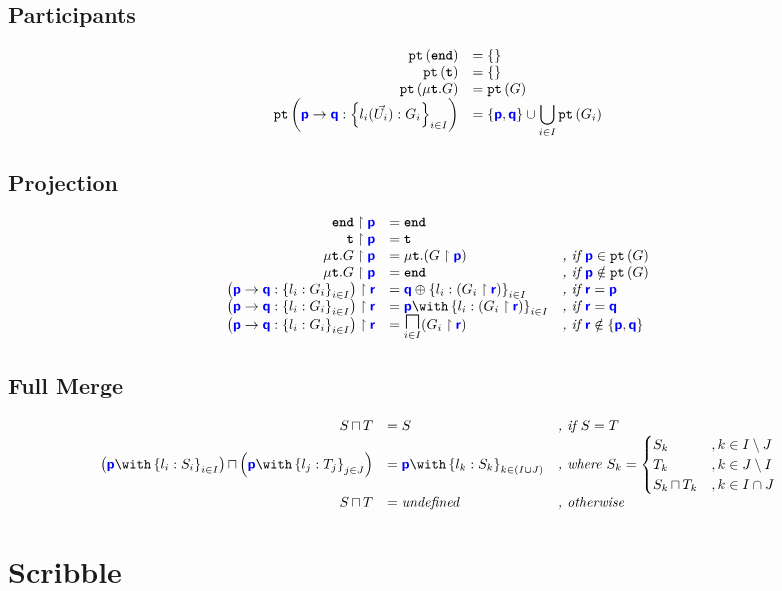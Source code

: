 \documentclass{article}
\begin{document}
\subsection{Participants}
\doublespacing
\[
\begin{array}{>{\displaystyle}r>{\displaystyle}l}
		\pt{\tyend} & = \left\{\right\} \\
		\pt{\tyrecvar} & = \left\{\right\} \\
		\pt{\tyrec{G}} & = \pt{G} \\
		\pt{\gcomm{p}{q}{l_i(\vec{U_i}): G_i}{i \in I}} & = \left\{\role{p},\role{q}\right\} \cup \bigcup_{i \in I}\pt{G_i} \\
\end{array}
\]
\singlespacing

\subsection{Projection}
\doublespacing
\[
\begin{array}{>{\displaystyle}r>{\displaystyle}l>{\displaystyle}l}
		\proj{\tyend}{p} & = \tyend & \\
		\proj{\tyrecvar}{p} & = \tyrecvar & \\
		\proj{\tyrec{G}}{p} & = \tyrec{(\proj{G}{p})} & \textit{, if }\role{p} \in \pt{G}\\
		\proj{\tyrec{G}}{p} & = \tyend & \textit{, if }\role{p} \notin \pt{G}\\
		\proj{\left(\gcomm{p}{q}{l_i: G_i}{i \in I}\right)}{r} & = \tysel{q}{l_i: (\proj{G_i}{r})}{i \in I} & \textit{, if }\role{r} = \role{p} \\
		\proj{\left(\gcomm{p}{q}{l_i: G_i}{i \in I}\right)}{r} & = \tybra{p}{l_i: (\proj{G_i}{r})}{i \in I} & \textit{, if }\role{r} = \role{q} \\
		\proj{\left(\gcomm{p}{q}{l_i: G_i}{i \in I}\right)}{r} & = \underset{i \in I}{\tyMERGEOP}{(\proj{G_i}{r})} & \textit{, if }\role{r} \notin \left\{\role{p},\role{q}\right\}
\end{array}
\]
\singlespacing

\subsection{Full Merge}
\doublespacing
\[
\begin{array}{>{\displaystyle}r>{\displaystyle}ll}
		\tymerge{S}{T} & = S & \textit{, if $S = T$} \\
		\tymerge{\left(\tybra{p}{l_i: S_i}{i \in I}\right)}{\left(\tybra{p}{l_j: T_j}{j \in J}\right)} & = \tybra{p}{l_k: S_k}{k \in (I \cup J)} & \textit{, where } S_k = \begin{cases}
S_k & , k \in I \setminus J \\
T_k & , k \in J \setminus I \\
\tymerge{S_k}{T_k} & , k \in I \cap  J
\end{cases} \\
		\tymerge{S}{T} & = \textit{undefined} & \textit{, otherwise}\\
\end{array}
\]
\singlespacing

\section{Scribble}
\end{document}
